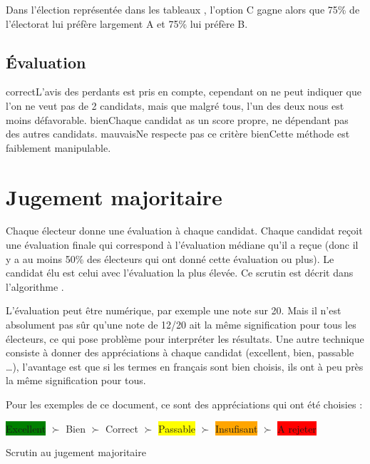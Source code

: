 \documentclass[../report]{subfiles}
\begin{document}
  Dans l'élection représentée dans les tableaux , l'option
  C gagne alors que 75\% de l'électorat lui préfère largement A et 75\% lui préfère B.

  \subsection{Évaluation}
  \tabcritere%
    {correct}{L'avis des perdants est pris en compte, cependant on ne peut indiquer que l'on ne veut pas de 2 candidats, mais que malgré tous, l'un des deux nous est moins défavorable.}%
    {bien}{Chaque candidat as un score propre, ne dépendant pas des autres candidats.}%
    {mauvais}{Ne respecte pas ce critère}%
    {bien}{Cette méthode est faiblement manipulable.}

  \section{Jugement majoritaire}

  Chaque électeur donne une évaluation à chaque candidat.
  Chaque candidat reçoit une évaluation finale qui correspond à l'évaluation médiane qu'il a reçue (donc il y a au moins 
  50\% des électeurs qui ont donné cette évaluation ou plus).
  Le candidat élu est celui avec l'évaluation la plus élevée.
  Ce scrutin est décrit dans l'algorithme .

  L'évaluation peut être numérique, par exemple une note sur 20. Mais il n'est absolument pas sûr qu'une note de 12/20 ait
  la même signification pour tous les électeurs, ce qui pose problème pour interpréter les résultats. 
  Une autre technique consiste à donner des appréciations à chaque candidat (excellent, bien, passable …), l'avantage
  est que si les termes en français sont bien choisis, ils ont à peu près la même signification pour tous.

  Pour les exemples de ce document, ce sont des appréciations qui ont été choisies : 

  \begin{center}
  \colorbox{green}{Excellent} $\succ$
  \colorbox{green!50!yellow}{Bien} $\succ$
  \colorbox{green!25!yellow}{Correct} $\succ$
  \colorbox{yellow}{Passable} $\succ$
  \colorbox{orange}{Insufisant} $\succ$
  \colorbox{red}{A rejeter}
  \end{center}
  
  \begin{algorithm}[H]
  \caption{Scrutin au jugement majoritaire}%
  \label{scrutin:jugement-maj}
  \begin{algorithmic}[1]
    \ENDFOR{}
    \ENDFOR{}
  \end{algorithmic}
  \end{algorithm}
\end{document}
